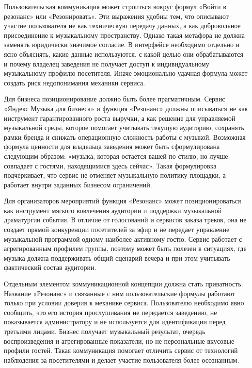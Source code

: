 Пользовательская коммуникация может строиться вокруг формул «Войти в резонанс» или «Резонировать». Эти выражения удобны тем, что описывают участие пользователя не как техническую передачу данных, а как добровольное присоединение к музыкальному пространству. Однако такая метафора не должна заменять юридически значимое согласие. В интерфейсе необходимо отдельно и ясно объяснять, какие данные используются, с какой целью они обрабатываются и почему владелец заведения не получает доступ к индивидуальному музыкальному профилю посетителя. Иначе эмоционально удачная формула может создать риск недопонимания механики сервиса.

Для бизнеса позиционирование должно быть более прагматичным. Сервис «Яндекс Музыка для бизнеса» и функция «Резонанс» должны описываться не как инструмент гарантированного роста выручки, а как решение для управляемой музыкальной среды, которое помогает учитывать текущую аудиторию, сохранять рамки бренда и снижать операционную сложность работы с музыкой. Возможная формула ценности для владельца заведения может быть сформулирована следующим образом: «музыка, которая остается вашей по стилю, но лучше совпадает с гостями, находящимися здесь сейчас». Такая формулировка подчеркивает, что сервис не отменяет музыкальную политику площадки, а работает внутри заданных бизнесом ограничений.

Для организаторов мероприятий функция «Резонанс» может позиционироваться как инструмент мягкого вовлечения аудитории и поддержки музыкальной драматургии события. В отличие от голосований и сервисов заказа треков, она не создает прямой конкуренции посетителей за эфир и не передает управление музыкальной программой одному наиболее активному гостю. Сервис работает с агрегированным профилем группы, поэтому может быть полезен в ситуациях, где музыка должна поддерживать общий сценарий вечера и при этом учитывать фактический состав аудитории.

Отдельным элементом коммуникационной концепции должна стать приватность. Название «Резонанс» и связанные с ним пользовательские формулы работают только при условии доверия к механике сервиса. Пользователю необходимо явно сообщить, что его история прослушивания не передается заведению, не показывается администратору и не используется для идентификации перед третьими лицами. Бизнес получает музыкальный результат, очередь воспроизведения и агрегированные показатели, но не персональные вкусовые профили гостей. Такая коммуникация помогает отличить сервис от технологий наблюдения за посетителями и делает участие пользователя более осознанным.

